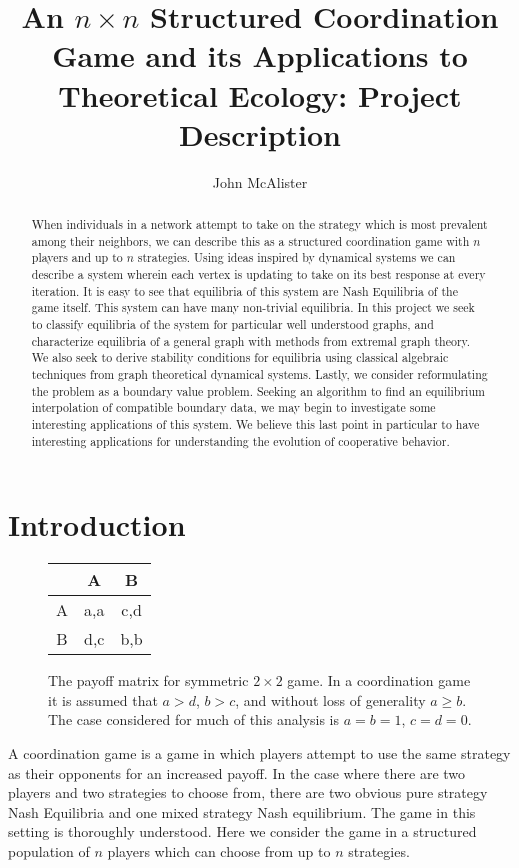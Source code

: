 \documentclass[]{article}
\title{An $n \times n$ Structured Coordination Game and its Applications to Theoretical Ecology: Project Description}
\author{John McAlister}
\begin{document}
\maketitle

\begin{abstract}
	When individuals in a network attempt to take on the strategy which is most prevalent among their neighbors, we can describe this as a structured coordination game with $n$ players and up to $n$ strategies. Using ideas inspired by dynamical systems we can describe a system wherein each vertex is updating to take on its best response at every iteration. It is easy to see that equilibria of this system are Nash Equilibria of the game itself. This system can have many non-trivial equilibria. In this project we seek to classify equilibria of the system for particular well understood graphs, and characterize equilibria of a general graph with methods from extremal graph theory. We also seek to derive stability conditions for equilibria using classical algebraic techniques from graph theoretical dynamical systems. Lastly, we consider reformulating the problem as a boundary value problem. Seeking an algorithm to find an equilibrium interpolation of compatible boundary data, we may begin to investigate some interesting applications of this system. We believe this last point in particular to have interesting applications for understanding the evolution of cooperative behavior.    
\end{abstract}

\section{Introduction}
\begin{figure}[h!]
	\centering
	\begin{tabular}{c|cc}
		&A&B\\
		\hline 
		A&a,a&c,d\\
		B&d,c&b,b
	\end{tabular}
	\caption{The payoff matrix for symmetric $2\times 2$ game. In a coordination game it is assumed that $a>d$, $b>c$, and without loss of generality $a\geq b$. The case considered for much of this analysis is $a=b=1$, $c=d=0$.}
\end{figure}
A coordination game is a game in which players attempt to use the same strategy as their opponents for an increased payoff. In the case where there are two players and two strategies to choose from, there are two obvious pure strategy Nash Equilibria and one mixed strategy Nash equilibrium. The game in this setting is thoroughly understood. Here we consider the game in a structured population of $n$ players which can choose from up to $n$ strategies. 
\end{document}
